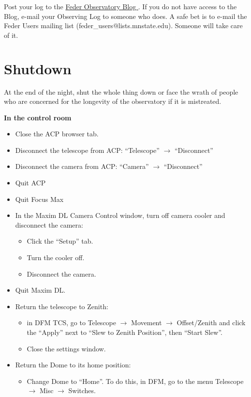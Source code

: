 \documentclass[letterpaper, 12pt]{report}
\newcommand{\location}[1]{\noindent\large{\textbf{#1}}}
\newcommand{\incontrol}{\location{In the control room}}
\begin{document}
Post your log to the \href{(http://astronomy.mnstate.edu/Feder_Observatory/}{Feder Observatory Blog }. If you do not have access to the Blog, e-mail your Observing Log to someone who does. A safe bet is to e-mail the Feder Users mailing list (feder\_users@lists.mnstate.edu). Someone will take care of it.

\newpage

\chapter{Shutdown}\label{ch:shutdown}

At the end of the night, shut the whole thing down or face the wrath of people who are concerned for the longevity of the observatory if it is mistreated.

\incontrol
\begin{itemize}
	\item Close the ACP browser tab.
	\item Disconnect the telescope from ACP: ``Telescope'' $\to$ ``Disconnect''
	\item Disconnect the camera from ACP: ``Camera'' $\to$ ``Disconnect''
	\item Quit ACP
	\item Quit Focus Max
	\item In the Maxim DL Camera Control window, turn off camera cooler and disconnect the camera:
		\begin{itemize}
			\item Click the ``Setup'' tab.
			\item Turn the cooler off.
			\item Disconnect the camera.
		\end{itemize}
	\item Quit Maxim DL.
	\item Return the telescope to Zenith:
	\begin{itemize}
		\item in DFM TCS, go to Telescope $\rightarrow$ Movement $\rightarrow$ Offset/Zenith and click the ``Apply'' next to ``Slew to Zenith Position'', then ``Start Slew''.
		\item Close the settings window.
	\end{itemize}
	\item Return the Dome to its home position:
		\begin{itemize}
			\item Change Dome to ``Home''. To do this, in DFM, go to the menu Telescope $\rightarrow$ Misc $\rightarrow$ Switches.

\end{itemize}
\end{itemize}
\end{document}
